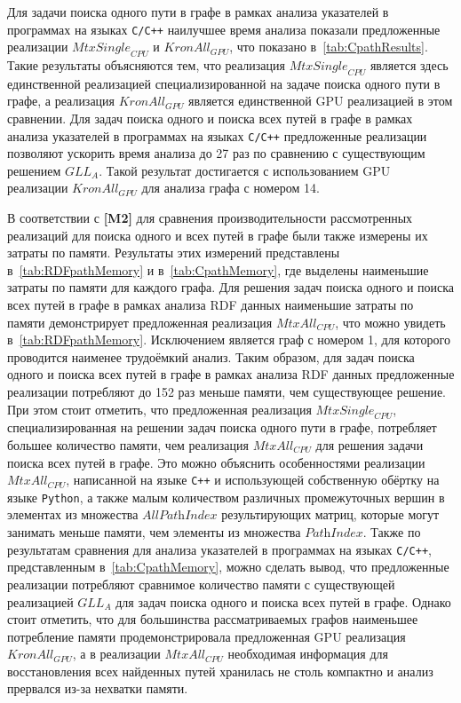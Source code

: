 Для задачи поиска одного пути в графе в рамках анализа указателей в программах на языках \texttt{C/C++} наилучшее время анализа показали предложенные реализации $\textit{MtxSingle}_{\textit{CPU}}$ и $\textit{KronAll}_{\textit{GPU}}$, что показано в~\cref{tab:CpathResults}. Такие результаты объясняются тем, что реализация $\textit{MtxSingle}_{\textit{CPU}}$ является здесь единственной реализацией специализированной на задаче поиска одного пути в графе, а реализация $\textit{KronAll}_{\textit{GPU}}$ является единственной GPU реализацией в этом сравнении. Для задач поиска одного и поиска всех путей в графе в рамках анализа указателей в программах на языках \texttt{C/C++} предложенные реализации позволяют ускорить время анализа до 27 раз по сравнению с существующим решением $\textit{GLL}_{\textit{A}}$. Такой результат достигается с использованием GPU реализации $\textit{KronAll}_{\textit{GPU}}$ для анализа графа с номером 14.

В соответствии с \textbf{[M2]} для сравнения производительности рассмотренных реализаций для поиска одного и всех путей в графе были также измерены их затраты по памяти. Результаты этих измерений представлены в~\cref{tab:RDFpathMemory} и в~\cref{tab:CpathMemory}, где выделены наименьшие затраты по памяти для каждого графа. Для решения задач поиска одного и поиска всех путей в графе в рамках анализа RDF данных наименьшие затраты по памяти демонстрирует предложенная реализация $\textit{MtxAll}_{\textit{CPU}}$, что можно увидеть в~\cref{tab:RDFpathMemory}. Исключением является граф с номером 1, для которого проводится наименее трудоёмкий анализ. Таким образом, для задач поиска одного и поиска всех путей в графе в рамках анализа RDF данных предложенные реализации потребляют до 152 раз меньше памяти, чем существующее решение. При этом стоит отметить, что предложенная реализация $\textit{MtxSingle}_{\textit{CPU}}$, специализированная на решении задач поиска одного пути в графе, потребляет большее количество памяти, чем реализация $\textit{MtxAll}_{\textit{CPU}}$ для решения задачи поиска всех путей в графе. Это можно объяснить особенностями реализации $\textit{MtxAll}_{\textit{CPU}}$, написанной на языке \texttt{C++} и использующей собственную обёртку на языке \texttt{Python}, а также малым количеством различных промежуточных вершин в элементах из множества $\textit{AllPathIndex}$ результирующих матриц, которые могут занимать меньше памяти, чем элементы из множества $\textit{PathIndex}$. Также по результатам сравнения для анализа указателей в программах на языках \texttt{C/C++}, представленным в~\cref{tab:CpathMemory}, можно сделать вывод, что предложенные реализации потребляют сравнимое количество памяти с существующей реализацией $\textit{GLL}_{\textit{A}}$ для задач поиска одного и поиска всех путей в графе. Однако стоит отметить, что для большинства рассматриваемых графов наименьшее потребление памяти продемонстрировала предложенная GPU реализация $\textit{KronAll}_{\textit{GPU}}$, а в реализации $\textit{MtxAll}_{\textit{CPU}}$ необходимая информация для восстановления всех найденных путей хранилась не столь компактно и анализ прервался из-за нехватки памяти.

